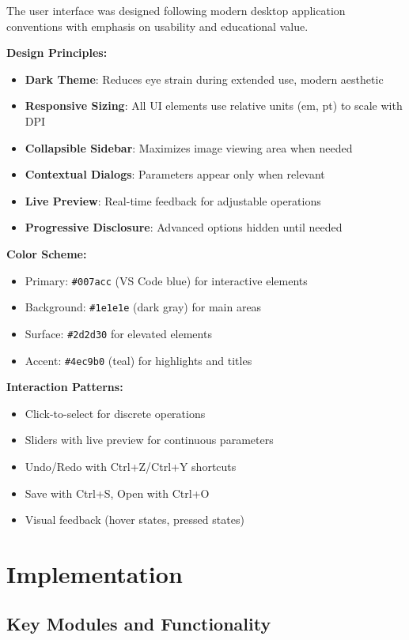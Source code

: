 \documentclass[12pt,a4paper]{article}
\begin{document}
The user interface was designed following modern desktop application conventions with emphasis on usability and educational value.

\textbf{Design Principles:}
\begin{itemize}
    \item \textbf{Dark Theme}: Reduces eye strain during extended use, modern aesthetic
    \item \textbf{Responsive Sizing}: All UI elements use relative units (em, pt) to scale with DPI
    \item \textbf{Collapsible Sidebar}: Maximizes image viewing area when needed
    \item \textbf{Contextual Dialogs}: Parameters appear only when relevant
    \item \textbf{Live Preview}: Real-time feedback for adjustable operations
    \item \textbf{Progressive Disclosure}: Advanced options hidden until needed
\end{itemize}

\textbf{Color Scheme:}
\begin{itemize}
    \item Primary: \texttt{\#007acc} (VS Code blue) for interactive elements
    \item Background: \texttt{\#1e1e1e} (dark gray) for main areas
    \item Surface: \texttt{\#2d2d30} for elevated elements
    \item Accent: \texttt{\#4ec9b0} (teal) for highlights and titles
\end{itemize}

\textbf{Interaction Patterns:}
\begin{itemize}
    \item Click-to-select for discrete operations
    \item Sliders with live preview for continuous parameters
    \item Undo/Redo with Ctrl+Z/Ctrl+Y shortcuts
    \item Save with Ctrl+S, Open with Ctrl+O
    \item Visual feedback (hover states, pressed states)
\end{itemize}

\section{Implementation}

\subsection{Key Modules and Functionality}
\end{document}
